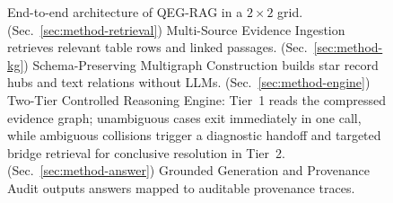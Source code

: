 \begin{figure}[t]
\centering

\vspace{0.5mm}
\caption{End-to-end architecture of QEG-RAG in a $2\times 2$ grid. (Sec.~\ref{sec:method-retrieval}) Multi-Source Evidence Ingestion retrieves relevant table rows and linked passages. (Sec.~\ref{sec:method-kg}) Schema-Preserving Multigraph Construction builds star record hubs and text relations without LLMs. (Sec.~\ref{sec:method-engine}) Two-Tier Controlled Reasoning Engine: Tier~1 reads the compressed evidence graph; unambiguous cases exit immediately in one call, while ambiguous collisions trigger a diagnostic handoff and targeted bridge retrieval for conclusive resolution in Tier~2. (Sec.~\ref{sec:method-answer}) Grounded Generation and Provenance Audit outputs answers mapped to auditable provenance traces.}
\vspace{-1.5mm}
\label{fig:pipeline}
\end{figure}
